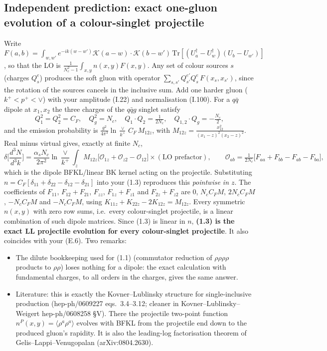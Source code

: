 \documentclass[10pt]{article}
\newcommand{\K}{\mathcal K}
\newcommand{\Tr}{\mathrm{Tr}}
\begin{document}
\subsection{Independent prediction: exact one-gluon evolution of a colour-singlet projectile}
Write $F(a,b)=\int_{w,w'}e^{-ik(w-w')}\K(a-w)\cdot\K(b-w')\,\Tr[(U^\dagger_a-U^\dagger_w)(U_b-U_{w'})]$, so that the LO is
$\frac{1}{N_c^2-1}\int_{x,y}n(x,y)F(x,y)$. Any set of colour sources $s$ (charges $Q_s^e$) produces the soft gluon with operator
$\sum_{s,s'}Q^{e'}_{s'}Q^e_s\,F(x_s,x_{s'})$, since the rotation of the sources cancels in the inclusive sum. Add one harder gluon
($k^+<p^+<\vee$) with your amplitude (I.22) and normalisation (I.100). For a $q\bar q$ dipole at $x_1,x_2$ the three charges of the
$q\bar qg$ singlet satisfy
\[
Q_1^2=Q_2^2=C_F,\quad Q_g^2=N_c,\quad Q_1\!\cdot Q_2=\tfrac{1}{2N_c},\quad Q_{1,2}\!\cdot Q_g=-\tfrac{N_c}{2},
\]
and the emission probability is $\frac{g^2}{4\pi^3}\ln\frac{\vee}{k^+}\,C_F\,M_{12z}$, with $M_{12z}=\frac{x_{12}^2}{(x_1-z)^2(x_2-z)^2}$. Real minus virtual gives, exactly at finite $N_c$,
\[
\delta\Big[\frac{d^3N}{d^3k}\Big]=\frac{\alpha_sN_c}{2\pi^2}\ln\frac{\vee}{k^+}\int_z M_{12z}\big[\mathcal O_{1z}+\mathcal O_{z2}-\mathcal O_{12}\big]\times(\text{LO prefactor}),\qquad
\mathcal O_{ab}=\tfrac{1}{2N_c}\big[F_{aa}+F_{bb}-F_{ab}-F_{ba}\big],
\]
which is the dipole BFKL/linear BK kernel acting on the projectile. Substituting $n=C_F[\delta_{11}+\delta_{22}-\delta_{12}-\delta_{21}]$ into
your (1.3) reproduces this \emph{pointwise in $z$}. The coefficients of $F_{11}$, $F_{12}+F_{21}$, $F_{zz}$, $F_{1z}+F_{z1}$ and $F_{2z}+F_{z2}$ are
$0$, $N_cC_FM$, $2N_cC_FM$, $-N_cC_FM$ and $-N_cC_FM$, using $K_{11z}+K_{22z}-2K_{12z}=M_{12z}$. Every symmetric $n(x,y)$ with zero row sums, i.e.\ every colour-singlet
projectile, is a linear combination of such dipole matrices. Since (1.3) is linear in $n$, \textbf{(1.3) is the exact LL projectile evolution
for every colour-singlet projectile}. It also coincides with your (E.6). Two remarks:
\begin{itemize}
\item The dilute bookkeeping used for (1.1) (commutator reduction of $\rho\rho\rho\rho$ products to $\rho\rho$) loses nothing for a dipole:
the exact calculation with fundamental charges, to all orders in the charges, gives the same answer.
\item Literature: this is exactly the Kovner--Lublinsky structure for single-inclusive production (hep-ph/0609227 eqs.~3.4--3.12;
cleaner in Kovner--Lublinsky--Weigert hep-ph/0608258 \S V). There the projectile two-point function $n^P(x,y)=\langle\rho^a\rho^a\rangle$ evolves with
BFKL from the projectile end down to the produced gluon's rapidity. It is also the leading-log factorisation theorem of
Gelis--Lappi--Venugopalan (arXiv:0804.2630).
\end{itemize}
\end{document}
